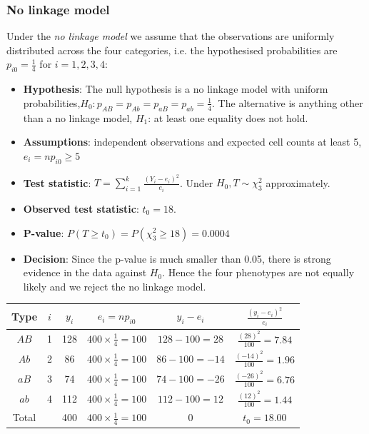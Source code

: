 \documentclass[a4paper]{article}
\begin{document}
\subsubsection{No linkage model}
Under the \textit{no linkage model} we assume that the observations are uniformly distributed across the four categories, i.e. the hypothesised probabilities are \( p_{i0} = \frac{1}{4} \) for \( i = 1,2,3,4 \):
\begin{itemize}
	\item \textbf{Hypothesis}: The null hypothesis is a no linkage model with uniform probabilities,\( H_0 : p_{AB} = p_{Ab} = p_{aB} = p_{ab} = \frac{1}{4} \). The alternative is anything other than a no linkage model, \( H_1 \): at least one equality does not hold.
	\item \textbf{Assumptions}: independent observations and expected cell counts at least 5, \( e_i = np_{i0} \geq 5 \)
	\item \textbf{Test statistic}: \( T = \sum\limits_{i=1}^{k} \frac{(Y_i - e_i)^2}{e_i} \). Under \( H_0, T \sim \chi^2_3 \) approximately.
	\item \textbf{Observed test statistic}: \( t_0 = 18 \).
	\item \textbf{P-value}: \( P(T\geq t_0) = P(\chi^2_3 \geq 18) =  0.0004 \)
	\item \textbf{Decision}: Since the p-value is much smaller than 0.05, there is strong evidence in the data against \( H_0 \). Hence the four phenotypes are not equally likely and we reject the no linkage model.
\end{itemize}
\begin{table}[H]
	\centering
	\begin{tabular}{@{}cc|cccc@{}}
	Type 	 & \( i \) & \( y_i \) & \( e_i = np_{i0} \) 				& \( y_i - e_i \)      & \( \frac{(y_i - e_i)^2}{e_i} \) \\ \midrule
	\( AB \) & 1 	   & 128  	   & \( 400 \times \frac{1}{4} = 100 \)	& \( 128 - 100 = 28 \) & \( \frac{(28)^2}{100} = 7.84 \)   \\
	\( Ab \) & 2   	   & 86  	   & \( 400 \times \frac{1}{4} = 100 \) & \( 86 - 100 = -14 \) & \( \frac{(-14)^2}{100} = 1.96 \)   \\
	\( aB \) & 3 	   & 74 	   & \( 400 \times \frac{1}{4} = 100 \) & \( 74 - 100 = -26 \) & \( \frac{(-26)^2}{100} = 6.76 \)	 \\
	\( ab \) & 4   	   & 112 	   & \( 400 \times \frac{1}{4} = 100 \) & \( 112 - 100 = 12 \) & \( \frac{(12)^2}{100} = 1.44  \)  \\ \midrule
	Total 	 & 	 	   & 400	   & \( 400 \times \frac{1}{4} = 100 \)	& 0 				   & \( t_0 = 18.00 \) 
	\end{tabular}
\end{table}
\end{document}
